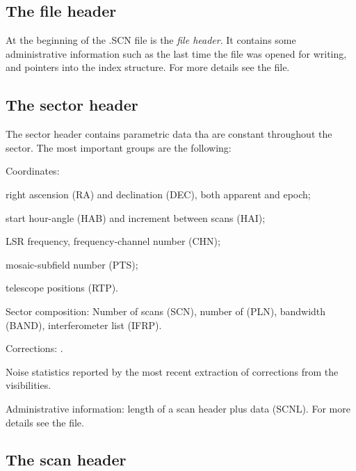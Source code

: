 \subsection{ The file header } 

        At the beginning of the .SCN file is the {\em file header}. It contains
some administrative information such as the last time the file was opened for
writing, and pointers into the index structure. For more details see the 
 file. 


\subsection{ The sector header } 

        The sector header contains parametric data tha are constant throughout
the sector. The most important groups are the following: 

\bi 
\item   Coordinates: 
  \bi 
  \item   right ascension (RA) and declination (DEC), both apparent and epoch; 
  \item   start hour-angle (HAB) and increment between scans (HAI); 
  \item   LSR frequency, frequency-channel number (CHN); 
  \item   mosaic-subfield number (PTS); 
  \item   telescope positions (RTP). 
  \ei 

\item   Sector composition: Number of scans (SCN), number of 
         (PLN), bandwidth (BAND), interferometer list 
        (IFRP). 

\item   Corrections: . 

\item   Noise statistics reported by the most recent 
         extraction of corrections from 
        the visibilities. 

\item   Administrative information: length of a scan header plus data (SCNL). 
\ei For more details see the  file. 


\subsection{ The scan header } 

